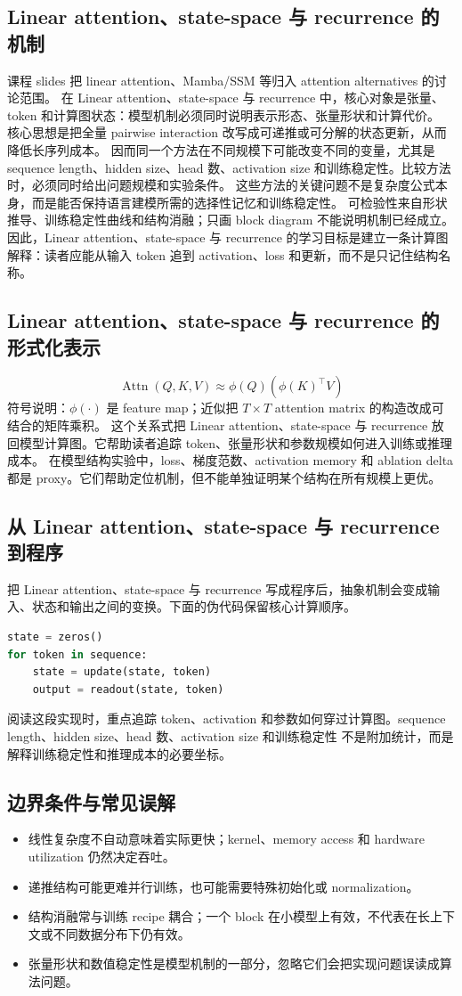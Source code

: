 \documentclass[a4paper]{article}
\begin{document}
\subsection{Linear attention、state-space 与 recurrence 的机制}
课程 slides 把 linear attention、Mamba/SSM 等归入 attention alternatives 的讨论范围。 在 Linear attention、state-space 与 recurrence 中，核心对象是张量、token 和计算图状态：模型机制必须同时说明表示形态、张量形状和计算代价。
核心思想是把全量 pairwise interaction 改写成可递推或可分解的状态更新，从而降低长序列成本。 因而同一个方法在不同规模下可能改变不同的变量，尤其是sequence length、hidden size、head 数、activation size 和训练稳定性。比较方法时，必须同时给出问题规模和实验条件。
这些方法的关键问题不是复杂度公式本身，而是能否保持语言建模所需的选择性记忆和训练稳定性。 可检验性来自形状推导、训练稳定性曲线和结构消融；只画 block diagram 不能说明机制已经成立。
因此，Linear attention、state-space 与 recurrence 的学习目标是建立一条计算图解释：读者应能从输入 token 追到 activation、loss 和更新，而不是只记住结构名称。
\subsection{Linear attention、state-space 与 recurrence 的形式化表示}
\[\operatorname{Attn}(Q,K,V)\approx \phi(Q)\left(\phi(K)^\top V\right)\]
符号说明：\(\phi(\cdot)\) 是 feature map；近似把 \(T\times T\) attention matrix 的构造改成可结合的矩阵乘积。
这个关系式把 Linear attention、state-space 与 recurrence 放回模型计算图。它帮助读者追踪 token、张量形状和参数规模如何进入训练或推理成本。
在模型结构实验中，loss、梯度范数、activation memory 和 ablation delta 都是 proxy。它们帮助定位机制，但不能单独证明某个结构在所有规模上更优。
\subsection{从 Linear attention、state-space 与 recurrence 到程序}
把 Linear attention、state-space 与 recurrence 写成程序后，抽象机制会变成输入、状态和输出之间的变换。下面的伪代码保留核心计算顺序。
\begin{lstlisting}[language=Python]
state = zeros()
for token in sequence:
    state = update(state, token)
    output = readout(state, token)
\end{lstlisting}
阅读这段实现时，重点追踪 token、activation 和参数如何穿过计算图。sequence length、hidden size、head 数、activation size 和训练稳定性 不是附加统计，而是解释训练稳定性和推理成本的必要坐标。
\subsection{边界条件与常见误解}
\begin{itemize}
\item 线性复杂度不自动意味着实际更快；kernel、memory access 和 hardware utilization 仍然决定吞吐。
\item 递推结构可能更难并行训练，也可能需要特殊初始化或 normalization。
\item 结构消融常与训练 recipe 耦合；一个 block 在小模型上有效，不代表在长上下文或不同数据分布下仍有效。
\item 张量形状和数值稳定性是模型机制的一部分，忽略它们会把实现问题误读成算法问题。
\end{itemize}
\end{document}
